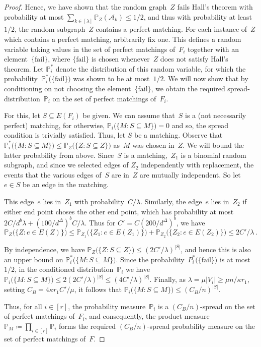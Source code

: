 \documentclass[10pt,a4paper]{amsart}
\newcommand{\fail}{\mathrm{fail}}
\begin{document}
\begin{proof}
    Hence, we have shown that the random graph~$Z$ fails Hall's theorem with probability at most $\sum_{k \in [\lambda]} \mathds{P}_Z(\mathcal{A}_k) \leq 1/2$, and thus with probability at least~$1/2$, the random subgraph~$Z$ contains a perfect matching. For each instance of~$Z$ which contains a perfect matching, arbitrarily fix one. This defines a random variable taking values in the set of perfect matchings of~$F_i$ together with an element~$\{\fail\}$, where $\{\fail\}$ is chosen whenever~$Z$ does not satisfy Hall's theorem. Let  $\mathds{P}_i^*$ denote the distribution of this random variable, for which the probability~$\mathds{P}_i^*\bigl(\{\fail\}\bigr)$ was shown to be at most~$1/2$. We will now show that by conditioning on not choosing the element~$\{\fail\}$, we obtain the required spread-distribution~$\mathds{P}_i$ on the set of perfect matchings of~$F_i$. 
    
    For this, let $S \subseteq E(F_i)$ be given. We can assume that~$S$ is a (not necessarily perfect) matching, for otherwise, $\mathds{P}_i\bigl(\{M : S \subseteq M\}\bigr) = 0$ and so, the spread condition is trivially satisfied. Thus, let $S$ be a matching. Observe that $\mathds{P}_i^*\bigl(\{M:S\subseteq M\}\bigr)\le\mathds{P}_Z\bigl(\{Z:S\subseteq Z\}\bigr)$ as~$M$ was chosen in~$Z$. We will bound the latter probability from above. Since~$S$ is a matching,~$Z_1$ is a binomial random subgraph, and since we selected edges of $Z_2$ independently with replacement, the events that the various edges of~$S$ are in~$Z$ are mutually independent. So let~$e \in S$ be an edge in the matching. 
    
    This edge~$e$ lies in~$Z_1$ with probability~$C/\lambda$. Similarly, the edge~$e$ lies in~$Z_2$ if either end point choses the other end point, which has probability at most $2C/d^b\lambda + (100/d^{\Delta})^b C/\lambda$. Thus for $C' = C(200/d^{\Delta})^b$, we have
    \[\mathds{P}_Z\bigl(\{Z:e\in E(Z)\}\bigr)\le \mathds{P}_{Z_1}\bigl(\{Z_1:e\in E(Z_1)\}\bigr)+\mathds{P}_{Z_2}\bigl(\{Z_2:e\in E(Z_2)\}\bigr)\le 2C'/\lambda\,.\]
    
    By independence, we have $\mathds{P}_Z\bigl(\{Z:S\subseteq Z\}\bigr)\le (2C'/\lambda)^{|S|}$, and hence this is also an upper bound on $\mathds{P}_i^*\bigl(\{M:S\subseteq M\}\bigr)$. Since the probability~$P_i^*\bigl(\{\mathrm{fail}\}\bigr)$ is at most~$1/2$, in the conditioned distribution~$\mathds{P}_i$ we have $\mathds{P}_i\bigl(\{M:S\subseteq M\}\bigr)\le 2(2C'/\lambda)^{|S|}\le (4C'/\lambda)^{|S|}$. Finally, as $\lambda = \mu |V_i| \geq \mu n/ \kappa r_1$, setting $C_B = 4\kappa r_1 C'/\mu$, it follows that $\mathds{P}_i\big(\{M: S \subseteq M\}\big) \leq (C_B/n)^{|S|}$. 
    
    Thus, for all $i \in [r]$, the probability measure~$\mathds{P}_i$ is a $(C_B/n)$-spread on the set of perfect matchings of~$F_i$, and consequently, the product measure $\mathds{P}_M \coloneqq \prod_{i \in [r]} \mathds{P}_i$ forms the required $(C_B/n)$-spread probability measure on the set of perfect matchings of~$F$.  
\end{proof}
\end{document}
